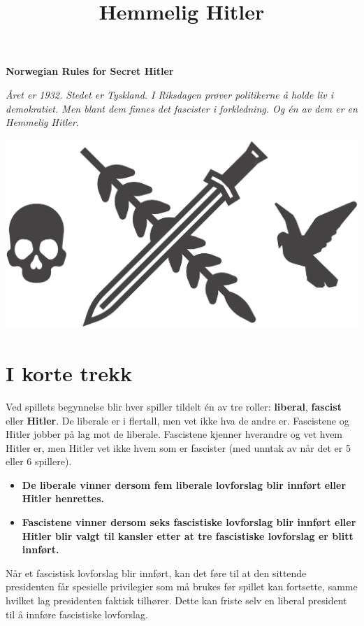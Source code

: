 \documentclass[a4paper, 10pt, twocolumn, twoside]{article}
\date{}
\title{Hemmelig Hitler\vspace{-3em}}
\begin{document}
\ttfamily
\maketitle

\begin{center}
    \textbf{Norwegian Rules for Secret Hitler}    
\end{center}
\textit{Året er 1932. Stedet er Tyskland. I Riksdagen prøver politikerne å holde liv i demokratiet. Men blant dem finnes det fascister i forkledning. Og én av dem er en Hemmelig Hitler.}
\begin{center}
\includegraphics[width=0.7\columnwidth]{./graphics/hitler_skalle_og_due}
\end{center}


\section{I korte trekk}
Ved spillets begynnelse blir hver spiller tildelt én av tre roller: \textbf{liberal}, \textbf{fascist} eller \textbf{Hitler}. De liberale er i flertall, men vet ikke hva de andre er. Fascistene og Hitler jobber på lag mot de liberale. Fascistene kjenner hverandre og vet hvem Hitler er, men Hitler vet ikke hvem som er fascister (med unntak av når det er 5 eller 6 spillere).  

\begin{itemize}
    \item \textbf{De liberale vinner dersom fem liberale lovforslag blir innført eller Hitler henrettes.}
    \item \textbf{Fascistene vinner dersom seks fascistiske lovforslag blir innført eller Hitler blir valgt til kansler etter at tre fascistiske lovforslag er blitt innført.}
\end{itemize}

Når et fascistisk lovforslag blir innført, kan det føre til at den sittende presidenten får spesielle privilegier som må brukes før spillet kan fortsette, samme hvilket lag presidenten faktisk tilhører. Dette kan friste selv en liberal president til å innføre fascistiske lovforslag.
\end{document}
